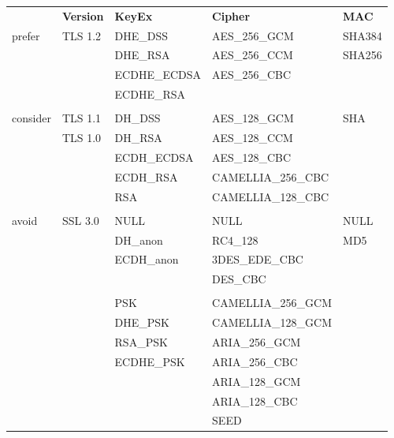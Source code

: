 \begin{center}
\begin{tabular}{lllll}
\cmidrule[\heavyrulewidth]{2-5}
& \textbf{Version}   & \textbf{KeyEx} & \textbf{Cipher}    & \textbf{MAC}       \\\cmidrule(lr){2-5}
\cellcolor{green}prefer  & TLS 1.2   & DHE\_DSS   & AES\_256\_GCM   & SHA384        \\
    &   & DHE\_RSA   & AES\_256\_CCM   & SHA256        \\
    &   & ECDHE\_ECDSA   & AES\_256\_CBC   &       \\
    &   & ECDHE\_RSA &   &       \\ 
    &   &   &   &       \\
\cellcolor{orange}consider    & TLS 1.1   & DH\_DSS    & AES\_128\_GCM   & SHA       \\
    & TLS 1.0   & DH\_RSA    & AES\_128\_CCM   &       \\
    &   & ECDH\_ECDSA    & AES\_128\_CBC   &       \\ 
    &   & ECDH\_RSA  & CAMELLIA\_256\_CBC  &       \\
    &   & RSA   & CAMELLIA\_128\_CBC  &       \\
    &   &   &   &       \\
\cellcolor{red}avoid   
& SSL 3.0   & NULL  & NULL  & NULL      \\
    &   & DH\_anon   & RC4\_128   & MD5       \\
    &   & ECDH\_anon & 3DES\_EDE\_CBC  &       \\
    &   &   & DES\_CBC   &       \\
    &   &   &   &       \\
\cellcolor{blue}{\color{white}special }
&   & PSK   & CAMELLIA\_256\_GCM  &       \\
    &   & DHE\_PSK   & CAMELLIA\_128\_GCM  &       \\
    &   & RSA\_PSK   & ARIA\_256\_GCM  &       \\
    &   & ECDHE\_PSK & ARIA\_256\_CBC  &       \\
    &   &   & ARIA\_128\_GCM  &       \\
    &   &   & ARIA\_128\_CBC  &       \\
    &   &   & SEED  &       \\
\cmidrule[\heavyrulewidth]{2-5}
\end{tabular}
\end{center}

